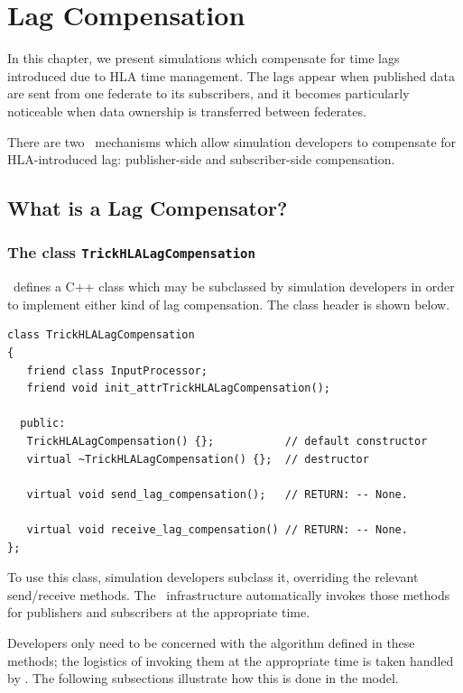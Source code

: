 \chapter{Lag Compensation}
\label{sec:hla-lag}

In this chapter,
we present simulations which compensate for time lags introduced due to
HLA time management.
The lags appear when published data are sent from one federate to
its subscribers, and
it becomes particularly noticeable when data ownership is transferred
between federates.

There are two \TrickHLA\ mechanisms which allow simulation developers
to compensate for HLA-introduced lag:
publisher-side and subscriber-side compensation.

\section{What is a Lag Compensator?}

\subsection{The class {\tt TrickHLALagCompensation}}

\TrickHLA\ defines a C++ class which may be subclassed by simulation
developers in order to implement either kind of lag compensation.
The class header is shown below.

\begin{lstlisting}[caption={The {\tt TrickHLALagCompensation} class},label={list:TrickHLALagCompensation}]
class TrickHLALagCompensation
{
   friend class InputProcessor;
   friend void init_attrTrickHLALagCompensation();

  public:
   TrickHLALagCompensation() {};           // default constructor
   virtual ~TrickHLALagCompensation() {};  // destructor

   virtual void send_lag_compensation();   // RETURN: -- None.

   virtual void receive_lag_compensation() // RETURN: -- None.
};
\end{lstlisting}

To use this class,
simulation developers subclass it, overriding the relevant send/receive methods.
The \TrickHLA\ infrastructure automatically invokes those methods
for publishers and subscribers at the appropriate time.

Developers only need to be concerned with the algorithm defined in these
methods; the logistics of invoking them at the appropriate time is taken
handled by \TrickHLA.
The following subsections illustrate how this is done in the \simplesine
model.

